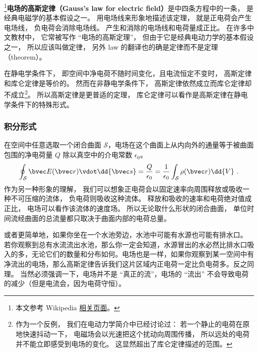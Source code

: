 

\footnote{本文参考 Wikipedia \href{https://en.wikipedia.org/wiki/Gauss's_law}{相关页面}。}\textbf{电场的高斯定律（Gauss's law for electric field）}是中四条方程中的一条， 是经典电磁学的基本假设之一。 用电场线来形象地描述该定理， 就是正电荷会产生电场线， 负电荷会消除电场线。 产生和消除的电场线和电荷量成正比。 在许多中文教材中， 它常被写作 “电场的高斯定理”， 但由于它是经典电动力学的基本假设之一， 所以应该叫做定律， 另外 law 的翻译也的确是定律而不是定理（theorem）。

在静电学条件下， 即空间中净电荷不随时间变化，且电流恒定不变时， 高斯定律和库仑定律是等价的。 然而在非静电学条件下， 高斯定律依然成立而库仑定律却不成立\footnote{作为一个反例， 我们在电动力学简介中已经讨论过： 若一个静止的电荷在原地快速抖动一下， 电磁场会以光速把这个扰动向周围传播， 所以远处的电荷并不能立即感受到电场的变化。 这显然超出了库仑定律描述的范围。}。 所以高斯定律是更普适的定理， 库仑定律可以看作是高斯定律在静电学条件下的特殊形式。

\subsubsection{积分形式}
在空间中任意选取一个闭合曲面 $\mathcal S$，电场在这个曲面上从内向外的通量等于被曲面包围的净电荷量 $Q$ 除以真空中的介电常数 $\epsilon_0$。
\begin{equation}\label{eq_EGauss_2}
\oint_{\mathcal S} \bvec E(\bvec r) \vdot \dd{\bvec s} = \frac{Q}{\epsilon_0} = \frac{1}{\epsilon_0} \int_{\mathcal S} \rho(\bvec r) \dd{V}~.
\end{equation}
作为另一种形象的理解， 我们可以想象正电荷会以固定速率向周围释放或吸收一种不可压缩的流体， 负电荷则吸收这种流体。 释放和吸收的速率和电荷绝对值成正比， 电场可以看作该流体的速度场。 所以无论取什么形状的闭合曲面， 单位时间流经曲面的总流量都只取决于曲面内部的电荷总量。

或者更简单地，如果你坐在一个水池旁边，水池中可能有水源也可能有排水口。 若你观察到总有水流流出水池，那么你一定会知道，水源冒出的水必然比排水口吸入的多，无论它们的数量和分布如何。电场也是一样，如果你观察到某一空间中有净流出的电场，那么高斯定律告诉我们这片区域内正电荷一定比负电荷多。反之同理。 当然必须强调一下，电场并不是 “真正的流”，电场的 “流出” 不会导致电荷的减少（但是电流会，因为电荷守恒）。

